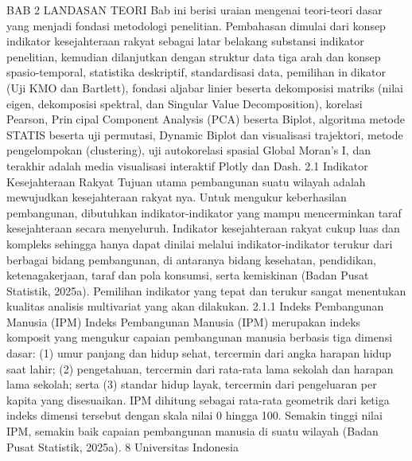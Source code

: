 BAB 2
LANDASAN TEORI
Bab ini berisi uraian mengenai teori-teori dasar yang menjadi fondasi metodologi
penelitian. Pembahasan dimulai dari konsep indikator kesejahteraan rakyat sebagai latar
belakang substansi indikator penelitian, kemudian dilanjutkan dengan struktur data tiga
arah dan konsep spasio-temporal, statistika deskriptif, standardisasi data, pemilihan indikator (Uji KMO dan Bartlett), fondasi aljabar linier beserta dekomposisi matriks (nilai
eigen, dekomposisi spektral, dan Singular Value Decomposition), korelasi Pearson, Principal Component Analysis (PCA) beserta Biplot, algoritma metode STATIS beserta uji
permutasi, Dynamic Biplot dan visualisasi trajektori, metode pengelompokan (clustering),
uji autokorelasi spasial Global Moran’s I, dan terakhir adalah media visualisasi interaktif
Plotly dan Dash.
2.1 Indikator Kesejahteraan Rakyat
Tujuan utama pembangunan suatu wilayah adalah mewujudkan kesejahteraan rakyatnya. Untuk mengukur keberhasilan pembangunan, dibutuhkan indikator-indikator yang
mampu mencerminkan taraf kesejahteraan secara menyeluruh. Indikator kesejahteraan
rakyat cukup luas dan kompleks sehingga hanya dapat dinilai melalui indikator-indikator
terukur dari berbagai bidang pembangunan, di antaranya bidang kesehatan, pendidikan,
ketenagakerjaan, taraf dan pola konsumsi, serta kemiskinan (Badan Pusat Statistik, 2025a).
Pemilihan indikator yang tepat dan terukur sangat menentukan kualitas analisis multivariat
yang akan dilakukan.
2.1.1 Indeks Pembangunan Manusia (IPM)
Indeks Pembangunan Manusia (IPM) merupakan indeks komposit yang mengukur
capaian pembangunan manusia berbasis tiga dimensi dasar: (1) umur panjang dan hidup
sehat, tercermin dari angka harapan hidup saat lahir; (2) pengetahuan, tercermin dari
rata-rata lama sekolah dan harapan lama sekolah; serta (3) standar hidup layak, tercermin
dari pengeluaran per kapita yang disesuaikan. IPM dihitung sebagai rata-rata geometrik
dari ketiga indeks dimensi tersebut dengan skala nilai 0 hingga 100. Semakin tinggi nilai
IPM, semakin baik capaian pembangunan manusia di suatu wilayah (Badan Pusat Statistik,
2025a).
8 Universitas Indonesia


